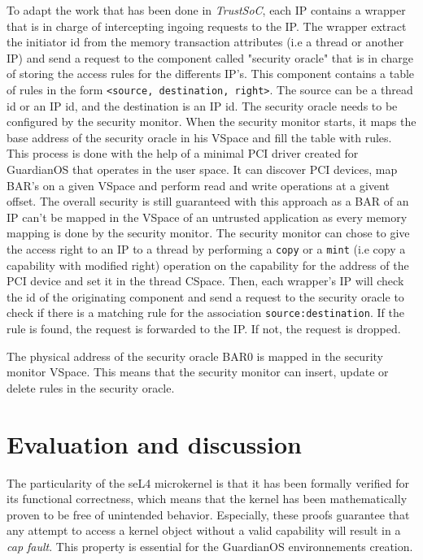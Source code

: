 \documentclass[conference]{IEEEtran}
\begin{document}
To adapt the work that has been done in \textit{TrustSoC}, each IP contains a wrapper that is in charge of intercepting ingoing requests to the IP. The wrapper extract the initiator id from the memory transaction attributes (i.e a thread or another IP) and send a request to the component called "security oracle" that is in charge of storing the access rules for the differents IP's. This component contains a table of rules in the form \texttt{<source, destination, right>}. The source can be a thread id or an IP id, and the destination is an IP id. The security oracle needs to be configured by the security monitor. When the security monitor starts, it maps the base address of the security oracle in his VSpace and fill the table with rules. This process is done with the help of a minimal PCI driver created for GuardianOS that operates in the user space. It can discover PCI devices, map BAR's on a given VSpace and perform read and write operations at a givent offset. The overall security is still guaranteed with this approach as a BAR of an IP can't be mapped in the VSpace of an untrusted application as every memory mapping is done by the security monitor. The security monitor can chose to give the access right to an IP to a thread by performing a \texttt{copy} or a \texttt{mint} (i.e copy a capability with modified right) operation on the capability for the address of the PCI device and set it in the thread CSpace. Then, each wrapper's IP will check the id of the originating component and send a request to the security oracle to check if there is a matching rule for the association \texttt{source:destination}. If the rule is found, the request is forwarded to the IP. If not, the request is dropped. 

The physical address of the security oracle BAR0 is mapped in the security monitor VSpace. This means that the security monitor can insert, update or delete rules in the security oracle. 


\section{Evaluation and discussion}
The particularity of the seL4 microkernel is that it has been formally verified for its functional correctness, which means that the kernel has been mathematically proven to be free of unintended behavior. Especially, these proofs guarantee that any attempt to access a kernel object without a valid capability will result in a \textit{cap fault}. This property is essential for the GuardianOS environnements creation.
\end{document}
